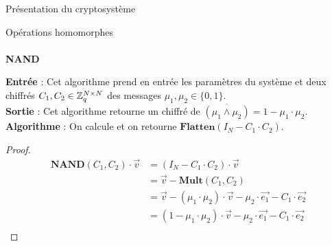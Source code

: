 \begin{section}{Présentation du cryptosystème}
\begin{subsection}{Opérations homomorphes}
	\paragraph{}
	\textbf{NAND}
	\flushleft
	
	\textbf{Entrée} : Cet algorithme prend en entrée les paramètres du système et deux chiffrés $C_1, C_2 \in \mathbb{Z}_q^{N \times N}$ des messages $\mu_1, \mu_2 \in \{ 0,1\}$.\\
	\textbf{Sortie} : Cet algorithme retourne un chiffré de $\overline{(\mu_1 \land \mu_2)} = 1 - \mu_1 \cdot \mu_2$. \\
	\textbf{Algorithme} : On calcule et on retourne $\textbf{Flatten}(I_N - C_1 \cdot C_2)$.
	\begin{proof}
	\begin{align*}
	\textbf{NAND}(C_1, C_2) \cdot \vec{v} &= (I_N - C_1 \cdot C_2) \cdot \vec{v}\\
	&= \vec{v} - \textbf{Mult}(C_1, C_2) \\
	&= \vec{v} - (\mu_1 \cdot \mu_2) \cdot \vec{v} - \mu_2 \cdot \vec{e_1} - C_1 \cdot \vec{e_2} \\
	&= (1 - \mu_1 \cdot \mu_2) \cdot \vec{v} - \mu_2 \cdot \vec{e_1} - C_1 \cdot \vec{e_2} \\
	\end{align*}
	\end{proof}
	
	\end{subsection}
\end{section}
